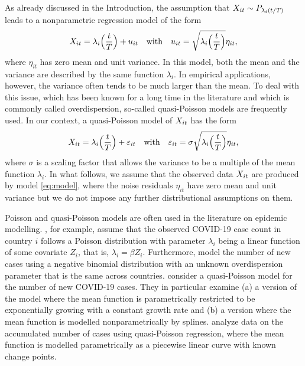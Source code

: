 \documentclass[a4paper,12pt]{article}
\numberwithin{equation}{section}
\begin{document}
As already discussed in the Introduction, the assumption that $X_{it} \sim P_{\lambda_i(t/T)}$ leads to a nonparametric regression model of the form 
\begin{equation}\label{eq:model-Poisson}
X_{it} = \lambda_i\Big(\frac{t}{T}\Big) + u_{it} \quad \text{with} \quad u_{it} = \sqrt{\lambda_i\Big(\frac{t}{T}\Big)} \eta_{it}, 
\end{equation}
where $\eta_{it}$ has zero mean and unit variance. In this model, both the mean and the variance are described by the same function $\lambda_i$. In empirical applications, however, the variance often tends to be much larger than the mean. To deal with this issue, which has been known for a long time in the literature \citep{Cox1983} and which is commonly called overdispersion, so-called quasi-Poisson models \citep{McCullagh1989, Efron1986} are frequently used. In our context, a quasi-Poisson model of $X_{it}$ has the form 
\begin{equation}\label{eq:model}
X_{it} = \lambda_i\Big(\frac{t}{T}\Big) + \varepsilon_{it} \quad \text{with} \quad \varepsilon_{it} = \sigma \sqrt{\lambda_i\Big(\frac{t}{T}\Big)} \eta_{it}, 
\end{equation}
where $\sigma$ is a scaling factor that allows the variance to be a multiple of the mean function $\lambda_i$. In what follows, we assume that the observed data $X_{it}$ are produced by model \eqref{eq:model}, where the noise residuals $\eta_{it}$ have zero mean and unit variance but we do not impose any further distributional assumptions on them.


Poisson and quasi-Poisson models are often used in the literature on epidemic modelling. \cite{DeSalazar2020}, for example, assume that the observed COVID-19 case count in country $i$ follows a Poisson distribution with parameter $\lambda_i$ being a linear function of some covariate $Z_i$, that is, $\lambda_i = \beta Z_i$. Furthermore, \cite{Banholzer2020} model the number of new cases using a negative binomial distribution with an unknown overdispersion parameter that is the same across countries. \cite{Pellis2020} consider a quasi-Poisson model for the number of new COVID-19 cases. They in particular examine (a) a version of the model where the mean function is parametrically restricted to be exponentially growing with a constant growth rate and (b) a version where the mean function is modelled nonparametrically by splines. \cite{Tobias2020} analyze data on the accumulated number of cases using quasi-Poisson regression, where the mean function is modelled parametrically as a piecewise linear curve with known change points.
 
\end{document}
